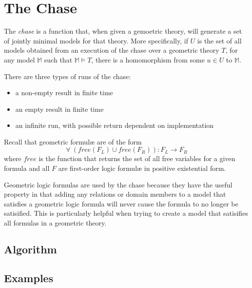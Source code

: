\section{The Chase}

	The \emph{chase} is a function that, when given a gemoetric theory, will
	generate a set of jointly minimal models for that theory. More
	specifically, if $U$ is the set of all models obtained from an execution of
	the chase over a geometric theory $T$, for any model $\mathbb{M}$ such that
	$\mathbb{M} \models T$, there is a homomorphism from some $u \in U$ to
	$\mathbb{M}$.

	There are three types of runs of the chase:
	\begin{itemize}
	\item a non-empty result in finite time
	\item an empty result in finite time
	\item an infinite run, with possible return dependent on implementation
	\end{itemize}

	Recall that geometric formul{\ae} are of the form
	\[\forall\ (free(F_L) \cup free(F_R)) : F_L \to F_R\]
	where $free$ is the function that returns the set of all free variables for
	a given formula and all $F$ are first-order logic formul{\ae} in positive
	existential form.

	Geometric logic formulas are used by the chase because they have the useful
	property in that adding any relations or domain members to a model that
	satisfies a geometric logic formula will never cause the formula to no
	longer be satisified. This is particularly helpful when trying to create a
	model that satisifies all formulas in a geometric theory.

	\subsection{Algorithm}

	\subsection{Examples}
